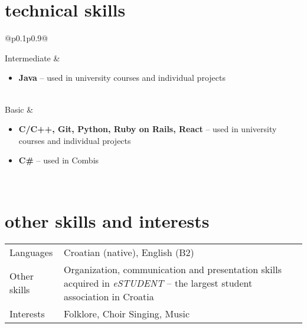 \documentclass[a4paper]{article}
\makeatletter
\newlength{\tablewidth}
\newenvironment{skills}{%
\setlength{\tablewidth}{\linewidth}
\addtolength{\tablewidth}{-2\tabcolsep}
\setlength{\extrarowheight}{0.2em}
\begin{tabular}{@{}p{0.1\tablewidth}p{0.9\tablewidth}@{}}
}{%
\end{tabular}
}
\makeatother
\begin{document}
\section{technical skills}
\begin{skills}
    Intermediate &
    \begin{itemize}
        \item \textbf{Java} -- used in university courses and individual projects
    \end{itemize} \\
    Basic &
    \begin{itemize}
        \item \textbf{C/C++, Git, Python, Ruby on Rails, React} -- used in university courses and individual projects
        \item \textbf{C\#} -- used in Combis
    \end{itemize} \\
\end{skills}

\section{other skills and interests}
\begin{skills}
	Languages & Croatian (native), English (B2)  \\
	Other skills & Organization, communication and presentation skills acquired in \textit{eSTUDENT} -- the largest student association in Croatia \\
    Interests & Folklore, Choir Singing, Music \\
\end{skills}
\end{document}
